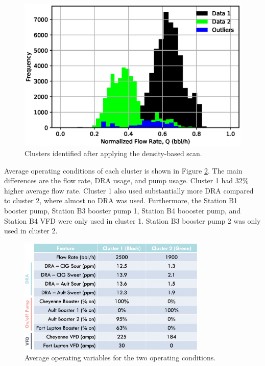 \begin{figure}[h]
    \centering
    \includegraphics[scale=0.8]{images/suncor/08DBSCAN.eps}
    \caption{Clusters identified after applying the density-based scan.}
    \label{fig:08DBSCAN}
\end{figure}

Average operating conditions of each cluster is shown in Figure \ref{fig:08cluster_variables}. The main differences are the flow rate, DRA usage, and pump usage.  Cluster 1 had 32\% higher average flow rate.  Cluster 1 also used substantially more DRA compared to cluster 2, where almost no DRA was used. Furthermore, the Station B1 booster pump, Station B3 booster pump 1, Station B4 boooster pump, and Station B4 VFD were only used in cluster 1.  Station B3 booster pump 2 was only used in cluster 2.
\begin{figure}
    \centering
    \includegraphics[width=0.8\textwidth]{images/suncor/08AvgChar.png}
    \caption{Average operating variables for the two operating conditions.}
    \label{fig:08cluster_variables}
\end{figure}

